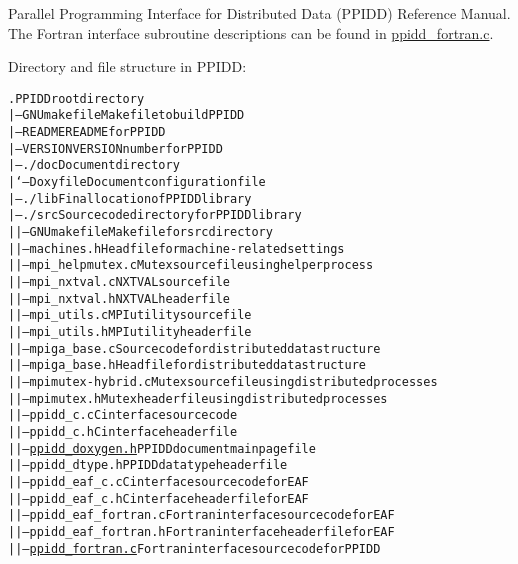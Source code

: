 Parallel Programming Interface for Distributed Data (PPIDD) Reference Manual. The Fortran interface subroutine descriptions can be found in \hyperlink{ppidd__fortran_8c}{ppidd\_\-fortran.c}.

Directory and file structure in PPIDD: \small\begin{alltt}\end{alltt}
\normalsize 


\small\begin{alltt}       .                                  PPIDD root directory
       |-- GNUmakefile                    Makefile to build PPIDD
       |-- README                         README for PPIDD
       |-- VERSION                        VERSION number for PPIDD
       |-- ./doc                          Document directory
       |   `-- Doxyfile                       Document configuration file
       |-- ./lib                          Final location of PPIDD library
       |-- ./src                          Source code directory for PPIDD library  
       |   |-- GNUmakefile                    Makefile for src directory
       |   |-- machines.h                     Head file for machine-related settings
       |   |-- mpi\_helpmutex.c                Mutex source file using helper process
       |   |-- mpi\_nxtval.c                   NXTVAL source file 
       |   |-- mpi\_nxtval.h                   NXTVAL header file
       |   |-- mpi\_utils.c                    MPI utility source file 
       |   |-- mpi\_utils.h                    MPI utility header file
       |   |-- mpiga\_base.c                   Source code for distributed data structure 
       |   |-- mpiga\_base.h                   Head file for distributed data structure
       |   |-- mpimutex-hybrid.c              Mutex source file using distributed processes
       |   |-- mpimutex.h                     Mutex header file using distributed processes
       |   |-- ppidd\_c.c                      C interface source code 
       |   |-- ppidd\_c.h                      C interface header file
       |   |-- \hyperlink{ppidd__doxygen_8h}{ppidd\_doxygen.h}                PPIDD document main page file
       |   |-- ppidd\_dtype.h                  PPIDD data type header file
       |   |-- ppidd\_eaf\_c.c                  C interface source code for EAF
       |   |-- ppidd\_eaf\_c.h                  C interface header file for EAF
       |   |-- ppidd\_eaf\_fortran.c            Fortran interface source code for EAF
       |   |-- ppidd\_eaf\_fortran.h            Fortran interface header file for EAF
       |   |-- \hyperlink{ppidd__fortran_8c}{ppidd\_fortran.c}                Fortran interface source code for PPIDD

\end{alltt}
